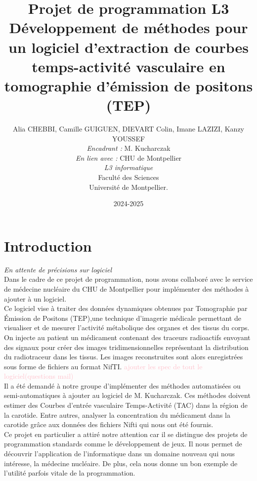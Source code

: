 \documentclass{article}
\title{Projet de programmation L3\\[0.5cm]Développement de méthodes pour un logiciel d'extraction de courbes temps-activité vasculaire en tomographie d'émission de positons (TEP)}
\author{Alia CHEBBI, Camille GUIGUEN, DIEVART Colin, Imane LAZIZI, Kanzy YOUSSEF\\[0.5cm]
    \emph{Encadrant :} M. Kucharczak\\
    \emph{En lien avec :} CHU de Montpellier\\[0.5cm]
    \emph{L3 informatique}\\Faculté des Sciences\\Université de Montpellier. }
\date{2024-2025}
\begin{document}
\maketitle

\newpage
\dominitoc  %
\tableofcontents
\newpage


\section{Introduction} 
\emph{En attente de précisions sur logiciel}\\[0.5cm]
    Dans le cadre de ce projet de programmation, nous avons collaboré avec le service de médecine nucléaire 
    du CHU de Montpellier pour implémenter des méthodes à ajouter à un logiciel.\\

    \noindent Ce logiciel vise à traiter des données dynamiques obtenues par Tomographie par Émission de Positons (TEP),une technique d'imagerie médicale permettant de visualiser et de mesurer l'activité métabolique des organes et des tissus du corps. 
    On injecte au patient un médicament contenant des traceurs radioactifs envoyant des signaux pour créer des images tridimensionnelles représentant la distribution du radiotraceur dans les tissus.
    Les images reconstruites sont alors enregistrées sous forme de fichiers au format NifTI.
    \textcolor{pink}{ajouter les spec de tout le logiciel(questions mail)}\\

    \noindent Il a été demandé à notre groupe d’implémenter des méthodes automatisées ou semi-automatiques à ajouter au logiciel 
    de M. Kucharczak. Ces méthodes doivent estimer des Courbes d'entrée vasculaire Temps-Activité (TAC) dans la région de 
    la carotide. Entre autres, analyser la concentration du médicament dans la carotide grâce aux données des fichiers 
    Nifti qui nous ont été fournis.\\

    \noindent Ce projet en particulier a attiré notre attention car il se distingue des projets de programmation standards comme le 
    développement de jeux. Il nous permet de découvrir l’application de l’informatique dans un domaine nouveau qui nous 
    intéresse, la médecine nucléaire. De plus, cela nous donne un bon exemple de l’utilité parfois vitale de la programmation.\\
\end{document}
